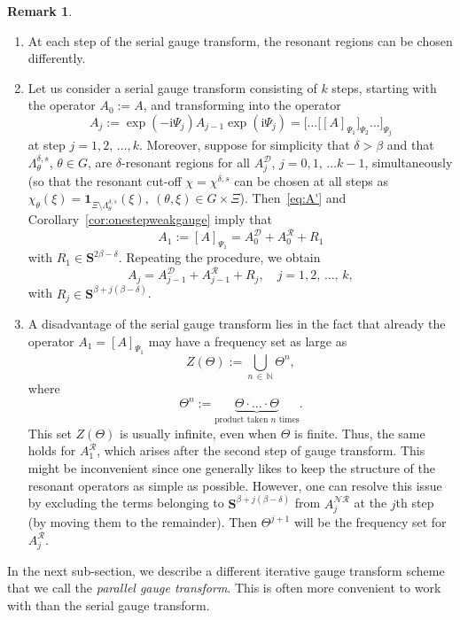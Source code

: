 \documentclass[10pt]{amsart}
\theoremstyle{definition}\newtheorem{defi}[theo]{Definition}\newtheorem{rema}[theo]{Remark}\newtheorem{exam}[theo]{Example}\newtheorem{nota}[theo]{Notation}
\newcommand{\rmi}{\mathrm{i}}
\newcommand{\N}{\mathbb N}
\newcommand{\CD}{\mathcal{D}}
\newcommand{\CN}{\mathcal{N}}
\newcommand{\CR}{\mathcal{R}}
\newcommand{\CNR}{{\CN\!\CR}}
\newcommand{\bone}{\boldsymbol 1}
\newcommand{\BS}{\mathbf S}
\newcommand{\rco}{\chi}
\newcommand*{\romanenumi}{\renewcommand*{\theenumi}{\roman{enumi}}}
\begin{document}
\begin{rema}\leavevmode
\begin{enumerate}\romanenumi
\item At each step of the serial gauge transform, the resonant regions can be chosen differently.
\item \label{item:consecsameres}
Let us consider a serial gauge transform consisting of $k$ steps, starting with the operator $A_0:=A$, and transforming into the operator
\begin{equation}
A_j:=\exp(-\rmi\Psi_j)A_{j-1}\exp(\rmi\Psi_j)=\big[\dots\big[[A]_{\Psi_1}\big]_{\Psi_2}\dots\big]_{\Psi_j}
\end{equation}
at step $j=1,2,\,\dots, k$. Moreover, suppose for simplicity that $\delta>\beta$ and that $\Lambda_{\theta}^{\delta,s}$, $\theta\in G$, are $\delta$-resonant regions for all $A_j^{\CD}$, $j=0,1,\,\dots k-1$, simultaneously (so that the resonant cut-off $\rco =\rco^{\delta, s}$ can be chosen at all steps as $\rco_\theta(\xi)=\bone_{\Xi\setminus\Lambda_{\theta}^{\delta,s}}(\xi), \ (\theta,\xi)\in G\times\Xi$). Then~\eqref{eq:A'} and Corollary~\ref{cor:onestepweakgauge} imply that
\begin{equation}
A_1:=[A]_{\Psi_1}=A_0^{\CD}+A_0^{\CR}+R_1
\end{equation}
with $R_1\in\BS^{2\beta-\delta}$. Repeating the procedure, we obtain
\begin{equation}
A_j=A_{j-1}^{\CD}+A_{j-1}^{\CR}+R_j,\quad j=1,2,\,\dots,\,k,
\end{equation}
with $R_j\in\BS^{\beta+j(\beta-\delta)}$.
\item A disadvantage of the serial gauge transform lies in the fact that already the operator $A_1=[A]_{\Psi_1}$ may have a frequency set as large as
\begin{equation}\label{eq:ZTheta}
Z(\Theta):= \bigcup_{n\,\in\,\N} \Theta^n,
\end{equation}
where
\begin{equation}
\Theta^n := \underbrace{\Theta \cdot \dotso \cdot \Theta}_{\text{product taken } n \text{ times}}.
\end{equation}
This set $Z(\Theta)$ is usually infinite, even when $\Theta$ is finite. Thus, the same holds for $A_1^{\CR}$, which arises after the second step of gauge transform. This might be inconvenient since one generally likes to keep the structure of the resonant operators as simple as possible. However, one can resolve this issue by excluding the terms belonging to $\BS^{\beta+j(\beta-\delta)}$ from $A_j^{\CNR}$ at the $j$th step (by moving them to the remainder). Then $\Theta^{j+1}$ will be the frequency set for $A_j^{\CR}$.
\end{enumerate}
\end{rema}
In the next sub-section, we describe a different iterative gauge transform scheme that we call the \emph{parallel gauge transform}. This is often more convenient to work with than the serial gauge transform.
\end{document}
